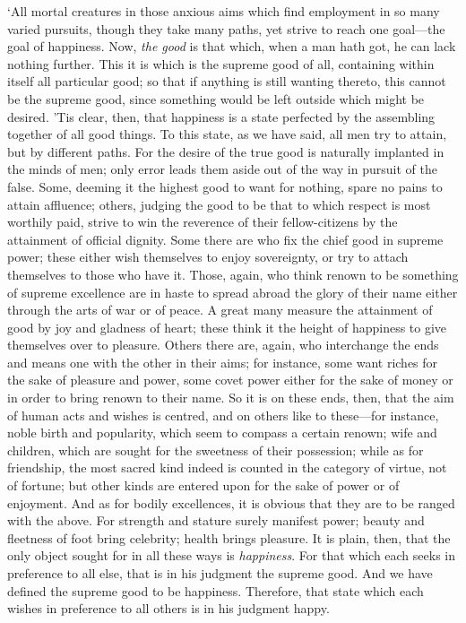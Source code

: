 \documentclass[11pt]{book}
\begin{document}
`All mortal creatures in those anxious aims which find employment in so
many varied pursuits, though they take many paths, yet strive to reach
one goal---the goal of happiness. Now, \emph{the good} is that which, when a
man hath got, he can lack nothing further. This it is which is the
supreme good of all, containing within itself all particular good; so
that if anything is still wanting thereto, this cannot be the supreme
good, since something would be left outside which might be desired. 'Tis
clear, then, that happiness is a state perfected by the assembling
together of all good things. To this state, as we have said, all men try
to attain, but by different paths. For the desire of the true good is
naturally implanted in the minds of men; only error leads them aside out
of the way in pursuit of the false. Some, deeming it the highest good to
want for nothing, spare no pains to attain affluence; others, judging
the good to be that to which respect is most worthily paid, strive to
win the reverence of their fellow-citizens by the attainment of official
dignity. Some there are who fix the chief good in supreme power; these
either wish themselves to enjoy sovereignty, or try to attach themselves
to those who have it. Those, again, who think renown to be something of
supreme excellence are in haste to spread abroad the glory of their name
either through the arts of war or of peace. A great many measure the
attainment of good by joy and gladness of heart; these think it the
height of happiness to give themselves over to pleasure. Others there
are, again, who interchange the ends and means one with the other in
their aims; for instance, some want riches for the sake of pleasure and
power, some covet power either for the sake of money or in order to
bring renown to their name. So it is on these ends, then, that the aim
of human acts and wishes is centred, and on others like to these---for
instance, noble birth and popularity, which seem to compass a certain
renown; wife and children, which are sought for the sweetness of their
possession; while as for friendship, the most sacred kind indeed is
counted in the category of virtue, not of fortune; but other kinds are
entered upon for the sake of power or of enjoyment. And as for bodily
excellences, it is obvious that they are to be ranged with the above.
For strength and stature surely manifest power; beauty and fleetness of
foot bring celebrity; health brings pleasure. It is plain, then, that
the only object sought for in all these ways is \emph{happiness}. For that
which each seeks in preference to all else, that is in his judgment the
supreme good. And we have defined the supreme good to be happiness.
Therefore, that state which each wishes in preference to all others is
in his judgment happy.
\end{document}
